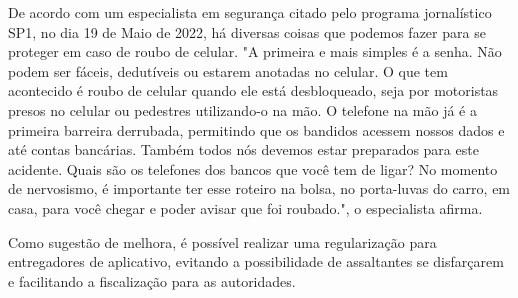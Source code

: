         De acordo com um especialista em segurança citado pelo programa jornalístico SP1, no dia 
        19 de Maio de 2022, há diversas coisas que podemos fazer para se proteger em caso de
        roubo de celular. "A primeira e mais simples é a senha. Não podem ser fáceis, dedutíveis
        ou estarem anotadas no celular. O que tem acontecido é roubo de celular quando ele está
        desbloqueado, seja por motoristas presos no celular ou pedestres utilizando-o na mão. O
        telefone na mão já é a primeira barreira derrubada, permitindo que os bandidos acessem
        nossos dados e até contas bancárias. Também todos nós devemos estar preparados para este 
        acidente. Quais são os telefones dos bancos que você tem de ligar? No momento de nervosismo,
        é importante ter esse roteiro na bolsa, no porta-luvas do carro, em casa, para você chegar
        e poder avisar que foi roubado.", o especialista afirma.

        Como sugestão de melhora, é possível realizar uma regularização para entregadores de
        aplicativo, evitando a possibilidade de assaltantes se disfarçarem e facilitando a
        fiscalização para as autoridades.